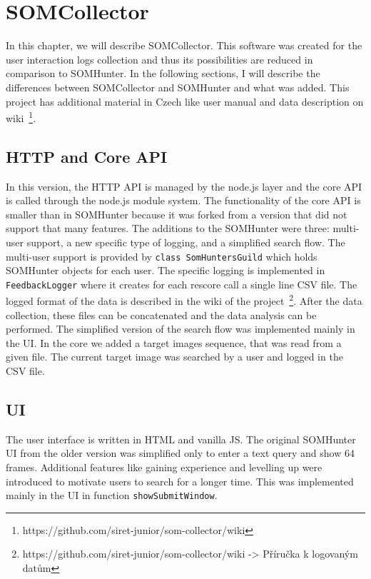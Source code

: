 \chapter{SOMCollector}
\label{somcollector}

In this chapter, we will describe SOMCollector. This software was created for the user interaction logs collection and thus its possibilities are reduced in comparison to SOMHunter. In the following sections, I will describe the differences between SOMCollector and SOMHunter and what was added. This project has additional material in Czech like user manual and data description on wiki~\footnote{https://github.com/siret-junior/som-collector/wiki}. 

\section{HTTP and Core API}
In this version, the HTTP API is managed by the node.js layer and the core API is called through the node.js module system. The functionality of the core API is smaller than in SOMHunter because it was forked from a version that did not support that many features. The additions to the SOMHunter were three: multi-user support, a new specific type of logging, and a simplified search flow. The multi-user support is provided by \lstinline{class SomHuntersGuild} which holds SOMHunter objects for each user. The specific logging is implemented in \lstinline{FeedbackLogger} where it creates for each rescore call a single line CSV file. The logged format of the data is described in the wiki of the project~\footnote{https://github.com/siret-junior/som-collector/wiki -> Příručka k logovaným datům}. After the data collection, these files can be concatenated and the data analysis can be performed. The simplified version of the search flow was implemented mainly in the UI. In the core we added a target images sequence, that was read from a given file. The current target image was searched by a user and logged in the CSV file.

\section{UI}

The user interface is written in HTML and vanilla JS. The original SOMHunter UI from the older version was simplified only to enter a text query and show 64 frames. Additional features like gaining experience and levelling up were introduced to motivate users to search for a longer time. This was implemented mainly in the UI in function \lstinline{showSubmitWindow}.
